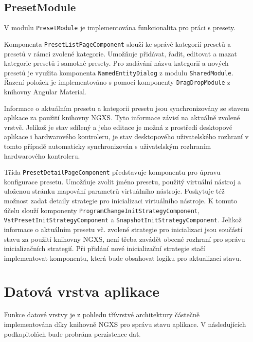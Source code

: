 \documentclass[thesis=M,czech]{FITthesis}[2019/03/06]
\begin{document}
		\subsection{PresetModule}
			V modulu \texttt{Preset\-Module} je implementována funkcionalita pro práci s presety.
			
			Komponenta \texttt{Preset\-List\-Page\-Component} slouží ke správě kategorií presetů a presetů v rámci zvolené kategorie.
			Umožňuje přidávat, řadit, editovat a mazat kategorie presetů i samotné presety. Pro zadávání názvu kategorií a nových presetů je využita komponenta \texttt{Named\-Entity\-Dialog} z modulu \texttt{SharedModule}. Řazení položek je implementováno s pomocí komponenty \texttt{Drag\-Drop\-Module} z knihovny Angular Material.

			Informace o aktuálním presetu a kategorii presetu jsou synchronizovány se stavem aplikace za použití knihovny NGXS.
			Tyto informace závisí na aktuálně zvolené vrstvě. Jelikož je stav sdílený a jeho editace je možná z prostředí desktopové aplikace i hardwarového kontroleru, je stav desktopového uživatelského rozhraní v tomto případě automaticky synchronizován s uživatelským rozhraním hardwarového kontroleru.
			
			Třída \texttt{Preset\-Detail\-Page\-Component} představuje komponentu pro úpravu konfigurace presetu.
			Umožňuje zvolit jméno presetu, použitý virtuální nástroj a uloženou stránku mapování parametrů virtuálního nástroje.
			Poskytuje též možnost zadat detaily strategie pro inicializaci virtuálního nástroje. K tomuto účelu slouží 
			komponenty \texttt{Program\-Change\-Init\-Strategy\-Component}, \linebreak \texttt{Vst\-Preset\-Init\-Strategy\-Component} a \texttt{Snapshot\-Init\-Strategy\-Component}. Jelikož informace o aktuálním presetu vč. zvolené strategie pro inicializaci jsou součástí stavu za použití knihovny NGXS, není třeba zavádět obecné rozhraní pro správu inicializačních strategií. 
			Při přidání nové inicializační strategie stačí implementovat komponentu, která bude obsahovat logiku pro aktualizaci stavu.
			
		
	\section{Datová vrstva aplikace}\label{sec:data-layer}
		Funkce datové vrstvy je z pohledu třívrstvé architektury částečně implementována díky knihovně NGXS pro správu stavu aplikace.
		V následujících podkapitolách bude probrána perzistence dat.
	
\end{document}
